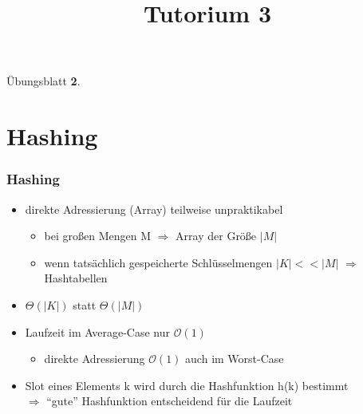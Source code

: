 
\title[Algorithmen I SS 14]{Tutorium 3}

\usepackage{alltt}





\begin{frame}
  \maketitle
\end{frame}

\begin{frame}
	\Huge
	\begin{center}
		Übungsblatt \textbf{2}.
	\end{center}
\end{frame}
\section{Hashing}


	\begin{frame}
		\frametitle{Hashing}
		\begin{itemize}
			\item direkte Adressierung (Array) teilweise unpraktikabel
			\begin{itemize}
				\item bei großen Mengen M $\Rightarrow$ Array der Größe $|M|$
				\item wenn tatsächlich gespeicherte Schlüsselmengen $|K| << |M|$ $\Rightarrow$ Hashtabellen
			\end{itemize}
			\item $\Theta (|K|)$ statt $\Theta (|M|)$
			\item Laufzeit im Average-Case nur $\mathcal{O}(1)$
			\begin{itemize}
				\item direkte Adressierung $\mathcal{O}(1)$ auch im Worst-Case
			\end{itemize}
			\item Slot eines Elements k wird durch die Hashfunktion h(k) bestimmt\\
 			$\Rightarrow$ "`gute"' Hashfunktion entscheidend für die Laufzeit
		\end{itemize}
	\end{frame}


